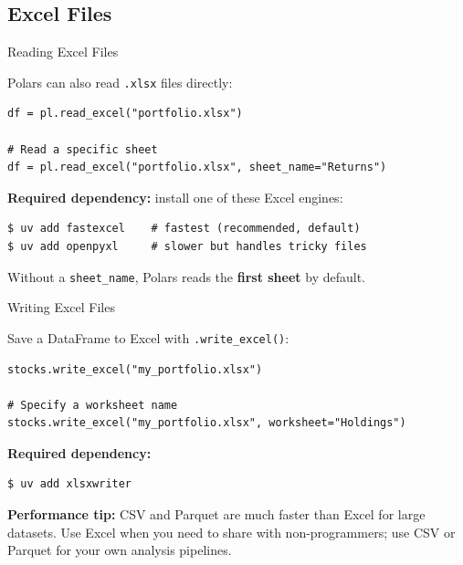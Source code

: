 \documentclass[9pt,aspectratio=169]{beamer}
\newcommand{\py}[1]{\lstinline[language=Python]{#1}}
\begin{document}
\subsection{Excel Files}

\begin{frame}[fragile]{Reading Excel Files}

Polars can also read \texttt{.xlsx} files directly:

\begin{lstlisting}
df = pl.read_excel("portfolio.xlsx")

# Read a specific sheet
df = pl.read_excel("portfolio.xlsx", sheet_name="Returns")
\end{lstlisting}

\medskip

\textbf{Required dependency:} install one of these Excel engines:

\begin{lstlisting}[style=shell]
$ uv add fastexcel    # fastest (recommended, default)
$ uv add openpyxl     # slower but handles tricky files
\end{lstlisting}

\medskip

\begin{highlightbox}
\centering
Without a \texttt{sheet\_name}, Polars reads the \textbf{first sheet} by default.
\end{highlightbox}

\end{frame}


\begin{frame}[fragile]{Writing Excel Files}

Save a DataFrame to Excel with \py{.write_excel()}:

\begin{lstlisting}
stocks.write_excel("my_portfolio.xlsx")

# Specify a worksheet name
stocks.write_excel("my_portfolio.xlsx", worksheet="Holdings")
\end{lstlisting}

\medskip

\textbf{Required dependency:}
\begin{lstlisting}[style=shell]
$ uv add xlsxwriter
\end{lstlisting}

\bigskip

\begin{highlightbox}
\centering
\textbf{Performance tip:} CSV and Parquet are much faster than Excel for large datasets. Use Excel when you need to share with non-programmers; use CSV or Parquet for your own analysis pipelines.
\end{highlightbox}

\end{frame}
\end{document}
